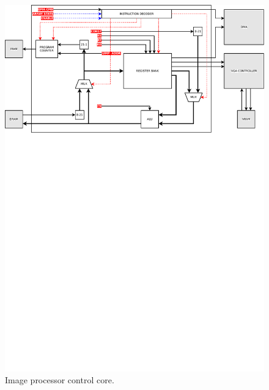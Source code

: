 \begin{figure}[h]
  \centering
  \includegraphics[width=\linewidth,clip,trim=0 18cm 0 0]
                  {fig/fpga/fpga_ctrl_core.pdf}
  \caption{Image processor control core.}
  \label{fig:fpga-ctrl-core}
\end{figure}
